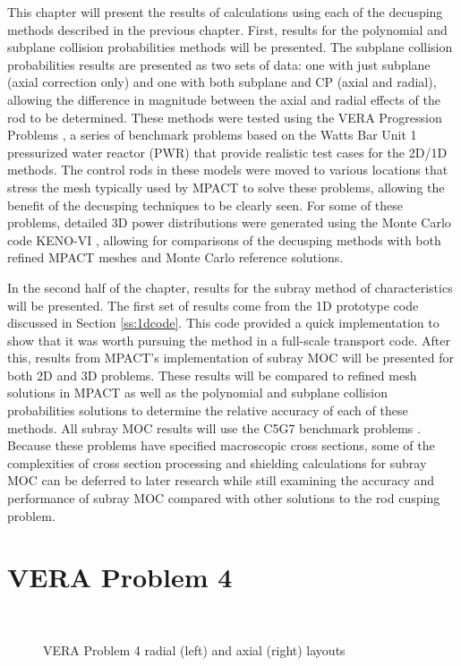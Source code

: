 This chapter will present the results of calculations using each of the decusping methods described in the previous chapter.  First, results for the polynomial and subplane collision probabilities methods will be presented.  The subplane collision probabilities results are presented as two sets of data: one with just subplane (axial correction only) and one with both subplane and CP (axial and radial), allowing the difference in magnitude between the axial and radial effects of the rod to be determined.  These methods were tested using the VERA Progression Problems \cite{VERAProgressionProblems}, a series of benchmark problems based on the Watts Bar Unit 1 pressurized water reactor (PWR) that provide realistic test cases for the 2D/1D methods.  The control rods in these models were moved to various locations that stress the mesh typically used by MPACT to solve these problems, allowing the benefit of the decusping techniques to be clearly seen.  For some of these problems, detailed 3D power distributions were generated using the Monte Carlo code KENO-VI \cite{SCALE6.2}, allowing for comparisons of the decusping methods with both refined MPACT meshes and Monte Carlo reference solutions.

In the second half of the chapter, results for the subray method of characteristics will be presented.  The first set of results come from the 1D prototype code discussed in Section \ref{ss:1dcode}.  This code provided a quick implementation to show that it was worth pursuing the method in a full-scale transport code.  After this, results from MPACT's implementation of subray MOC will be presented for both 2D and 3D problems.  These results will be compared to refined mesh solutions in MPACT as well as the polynomial and subplane collision probabilities solutions to determine the relative accuracy of each of these methods.  All subray MOC results will use the C5G7 benchmark problems \cite{EELewisC5G72003,EELewisC5G7extended2005}.  Because these problems have specified macroscopic cross sections, some of the complexities of cross section processing and shielding calculations for subray MOC can be deferred to later research while still examining the accuracy and performance of subray MOC compared with other solutions to the rod cusping problem.

\section{VERA Problem 4}\label{s:vera4}

\begin{figure}[h]\label{f:p4layout}
    \centering
    ~
    \caption{VERA Problem 4 radial (left) and axial (right) layouts}\label{f:p4}
\end{figure}


